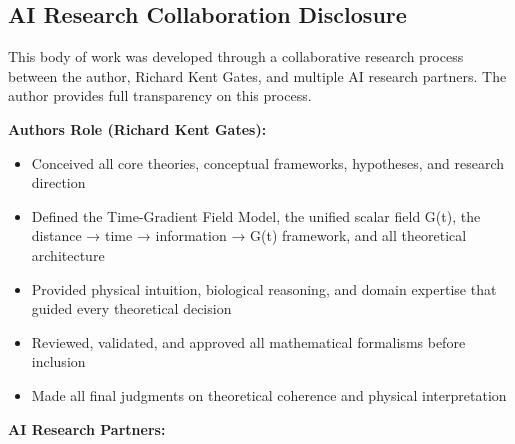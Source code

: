 \documentclass[
  10pt,
]{article}
\providecommand{\tightlist}{%
  \setlength{\itemsep}{0pt}\setlength{\parskip}{0pt}}
\begin{document}
\hypertarget{ai-research-collaboration-disclosure}{%
\subsection{AI Research Collaboration
Disclosure}\label{ai-research-collaboration-disclosure}}

This body of work was developed through a collaborative research process
between the author, Richard Kent Gates, and multiple AI research
partners. The author provides full transparency on this process.

\textbf{Author\textquotesingle s Role (Richard Kent Gates):}

\begin{itemize}
\tightlist
\item
  Conceived all core theories, conceptual frameworks, hypotheses, and
  research direction
\item
  Defined the Time-Gradient Field Model, the unified scalar field G(t),
  the distance → time → information → G(t) framework, and all
  theoretical architecture
\item
  Provided physical intuition, biological reasoning, and domain
  expertise that guided every theoretical decision
\item
  Reviewed, validated, and approved all mathematical formalisms before
  inclusion
\item
  Made all final judgments on theoretical coherence and physical
  interpretation
\end{itemize}

\textbf{AI Research Partners:}
\end{document}
